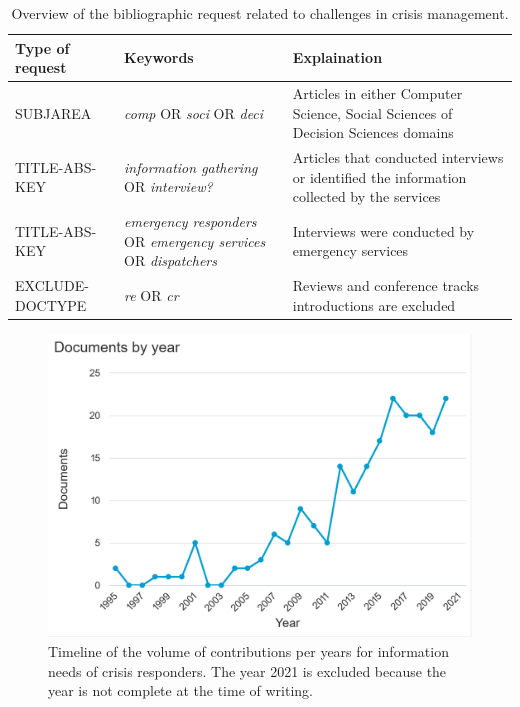 \begin{table}[bht]
    \centering
    \tabulinesep=1.2mm
    \caption{Overview of the bibliographic request related to challenges in crisis management.}
    \begin{tabu} to \textwidth {X[0.5,r]X[1,m]X[1,m]}
        Type of request & Keywords                                                                             & Explaination                                                                               \\ [0.5ex]
        \toprule
        SUBJAREA        & \textit{comp} OR \emph{soci} OR \emph{deci}                                          & Articles in either Computer Science, Social Sciences of Decision Sciences domains          \\
        TITLE-ABS-KEY   & \textit{information gathering} OR \textit{interview?}                                & Articles that conducted interviews or identified the information collected by the services \\
        TITLE-ABS-KEY   & \textit{emergency responders} OR \textit{emergency services} OR \textit{dispatchers} & Interviews were conducted by emergency services                                            \\
        EXCLUDE-DOCTYPE & \textit{re} OR \textit{cr}                                                           & Reviews and conference tracks introductions are excluded                                   \\
        \bottomrule
    \end{tabu}
    \label{table:emergency-services-challenges}
\end{table}

\begin{figure}[thb]
    \centering
    \includegraphics[width=\textwidth]{figures/chap-2/business-needs-hist.pdf}
    \caption{Timeline of the volume of contributions per years for information needs of crisis responders. The year 2021 is excluded because the year is not complete at the time of writing.}
    \label{literature:business-needs-hist}
\end{figure}

